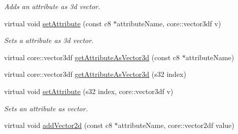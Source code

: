 \begin{DoxyCompactItemize}
\begin{DoxyCompactList}\small\item\em Adds an attribute as 3d vector. \end{DoxyCompactList}\item 
virtual void \hyperlink{classirr_1_1io_1_1_c_attributes_aefc8f6d193a2267e61347993fb5e9a7c}{set\-Attribute} (const c8 $\ast$attribute\-Name, core\-::vector3df v)
\begin{DoxyCompactList}\small\item\em Sets a attribute as 3d vector. \end{DoxyCompactList}\item 
virtual core\-::vector3df \hyperlink{classirr_1_1io_1_1_c_attributes_abf2d9ef9b269e708bcd9631e6b54380e}{get\-Attribute\-As\-Vector3d} (const c8 $\ast$attribute\-Name)
\item 
virtual core\-::vector3df \hyperlink{classirr_1_1io_1_1_c_attributes_a3524c97469285913b43faf34f30a639c}{get\-Attribute\-As\-Vector3d} (s32 index)
\item 
virtual void \hyperlink{classirr_1_1io_1_1_c_attributes_adaa284fc7bdd81fe703db9e0c8572e99}{set\-Attribute} (s32 index, core\-::vector3df v)
\begin{DoxyCompactList}\small\item\em Sets an attribute as vector. \end{DoxyCompactList}\item 
\hypertarget{classirr_1_1io_1_1_c_attributes_a8cfb99e48043c2bf205c8a43d1dc0436}{virtual void \hyperlink{classirr_1_1io_1_1_c_attributes_a8cfb99e48043c2bf205c8a43d1dc0436}{add\-Vector2d} (const c8 $\ast$attribute\-Name, core\-::vector2df value)}\label{classirr_1_1io_1_1_c_attributes_a8cfb99e48043c2bf205c8a43d1dc0436}


\end{DoxyCompactItemize}
